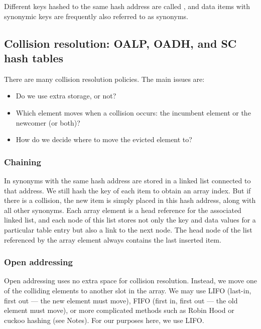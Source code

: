 Different keys hashed to the same hash address are  called , 
and data items with synonymic keys are frequently also referred to as 
synonyms. 

\subsection{Collision resolution: OALP, OADH, and SC hash tables}

There are many collision resolution policies. The main issues are:

\begin{itemize}
\item Do we use extra storage, or not?
\item Which element moves when a collision occurs: the incumbent element or the 
newcomer (or both)?
\item How do we decide where to move the evicted element to?
\end{itemize}

\subsubsection{Chaining}

In  synonyms with the same hash address are stored 
in a linked list connected to that address.  We still hash the key of 
each item to obtain an array index. But if there is a collision, 
the new item is simply placed in this hash address, along with all other
synonyms. Each array element is a head reference for the associated linked 
list, and each node of this list stores not only the key and data
values for a particular table entry but also a link to the
next node. The head node of the list referenced by the array
element always contains the last inserted item.

\subsubsection{Open addressing}

Open addressing uses no extra space for collision resolution. Instead, 
we move one of the colliding elements to another slot in the array. We may use
LIFO (last-in, first out --- the new element must move), FIFO (first in, first out 
--- the old element must move), or more complicated methods such as Robin Hood 
or cuckoo hashing (see Notes). For our purposes here, we use LIFO.

